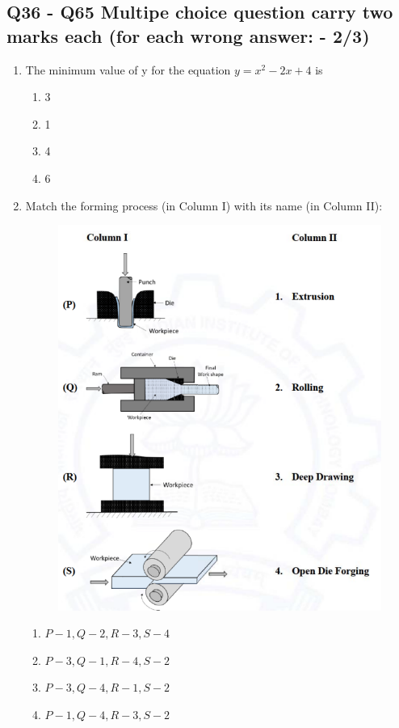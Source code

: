 \documentclass[journal]{IEEEtran}
\theoremstyle{remark}
\begin{document}
\subsection*{Q36 - Q65 Multipe choice question carry two marks each  (for each wrong answer: - 2/3)}
\begin{enumerate}[resume]
\item The minimum value of y for the equation $y = x^2 - 2x + 4$ is \hfill{}
\begin{multicols}{4}
\begin{enumerate}
\item 3
\item 1
\item 4
\item 6
\end{enumerate}
\end{multicols}

\item Match the forming process (in Column I) with its name (in Column II): \hfill{}
\begin{figure}[H]
    \centering
    \includegraphics[width=0.8\columnwidth]{figs/Q.27.png}
    \caption{}
    \label{fig:placeholder}
\end{figure}
\begin{multicols}{2}
\begin{enumerate}
\item $P-1, Q-2, R-3, S-4$
\item $P-3, Q-1, R-4, S-2$
\item $P-3, Q-4, R-1, S-2$
\item $P-1, Q-4, R-3, S-2$
\end{enumerate}
\end{multicols}


\end{enumerate}
\end{document}
